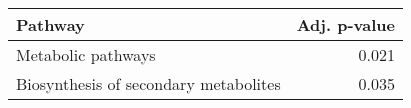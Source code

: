 \begin{tabular}{lr}
\toprule
                               Pathway &  Adj. p-value \\
\midrule
                    Metabolic pathways &         0.021 \\
 Biosynthesis of secondary metabolites &         0.035 \\
\bottomrule
\end{tabular}

